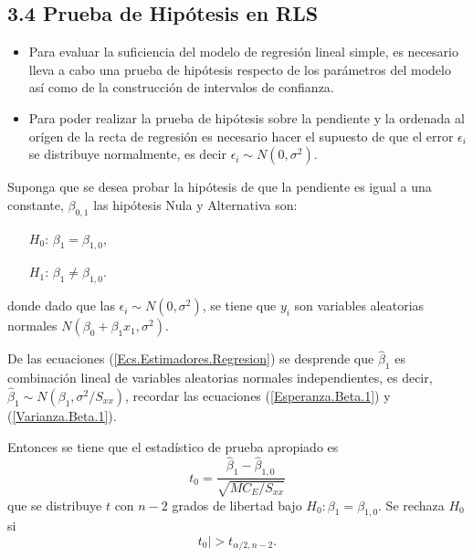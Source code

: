%
\subsection{3.4 Prueba de Hip\'otesis en RLS}




\begin{itemize}
\item Para evaluar la suficiencia del modelo de regresi\'on lineal simple, es necesario lleva a cabo una prueba de hip\'otesis respecto de los par\'ametros del modelo as\'i como de la construcci\'on de intervalos de confianza.

\item Para poder realizar la prueba de hip\'otesis sobre la pendiente y la ordenada al or\'igen de la recta de regresi\'on es necesario hacer el supuesto de que el error $\epsilon_{i}$ se distribuye normalmente, es decir $\epsilon_{i} \sim N\left(0,\sigma^{2}\right)$.

\end{itemize}


Suponga que se desea probar la hip\'otesis de que la pendiente es igual a una constante, $\beta_{0,1}$ las hip\'otesis Nula y Alternativa son:
\begin{centering}
\begin{itemize}
\item[$H_{0}$: ] $\beta_{1}=\beta_{1,0}$,

\item[$H_{1}$: ]$\beta_{1}\neq\beta_{1,0}$.

\end{itemize}

donde dado que las $\epsilon_{i} \sim N\left(0,\sigma^{2}\right)$, se tiene que $y_{i}$ son variables aleatorias normales $N\left(\beta_{0}+\beta_{1}x_{1},\sigma^{2}\right)$. 
\end{centering}




De las ecuaciones (\ref{Ecs.Estimadores.Regresion}) se desprende que $\hat{\beta}_{1}$ es combinaci\'on lineal de variables aleatorias normales independientes, es decir, $\hat{\beta}_{1}\sim N\left(\beta_{1},\sigma^{2}/S_{xx}\right)$, recordar las ecuaciones (\ref{Esperanza.Beta.1}) y (\ref{Varianza.Beta.1}).

Entonces se tiene que el estad\'istico de prueba apropiado es
\begin{equation}\label{Estadistico.Beta.1}
t_{0}=\frac{\hat{\beta}_{1}-\hat{\beta}_{1,0}}{\sqrt{MC_{E}/S_{xx}}}
\end{equation}
que se distribuye $t$ con $n-2$ grados de libertad bajo $H_{0}:\beta_{1}=\beta_{1,0}$. Se rechaza $H_{0}$ si 
\begin{equation}\label{Zona.Rechazo.Beta.1}
t_{0}|>t_{\alpha/2,n-2}.
\end{equation}







